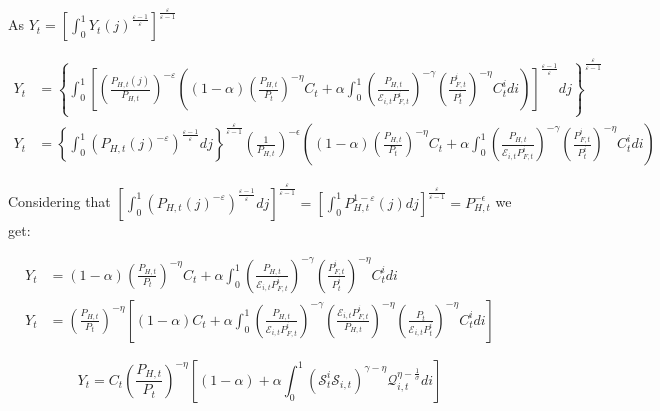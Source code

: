 \documentclass{article}
\begin{document}
As $Y_t = \left[\int^1_0 Y_t(j)^{\frac{\varepsilon-1}{\varepsilon}} \right]^\frac{\varepsilon}{\varepsilon-1}$

\begin{equation}
    \label{}
    \begin{split}
    Y_{t} &= \left\{ \int^1_0 \left[ \left( \frac{P_{H,t}(j)}{P_{H,t}} \right)^{-\varepsilon} \left((1-\alpha) \left( \frac{P_{H,t}}{P_t} \right)^{-\eta} C_t +  \alpha \int_0^1 \left( \frac{P_{H,t}}{\mathcal{E}_{i,t} P^i_{F,t}} \right)^{-\gamma} \left( \frac{P^i_{F,t}}{P^i_{t}} \right)^{-\eta} C^i_t di \right)\right]^{\frac{\varepsilon-1}{\varepsilon}}dj \right\}^\frac{\varepsilon}{\varepsilon-1}\\
    Y_{t} &= \left\{ \int^1_0 \left( P_{H,t}(j)^{-\varepsilon} \right)^{\frac{\varepsilon-1}{\varepsilon}}dj \right\}^\frac{\varepsilon}{\varepsilon-1} \left(\frac{1}{P_{H,t}}\right)^{-\epsilon} \left((1-\alpha) \left( \frac{P_{H,t}}{P_t} \right)^{-\eta} C_t +  \alpha \int_0^1 \left( \frac{P_{H,t}}{\mathcal{E}_{i,t} P^i_{F,t}} \right)^{-\gamma} \left( \frac{P^i_{F,t}}{P^i_{t}} \right)^{-\eta} C^i_t di \right)
    \end{split}
\end{equation}


Considering that $\left[ \int^1_0 \left( P_{H,t}(j)^{-\varepsilon} \right)^{\frac{\varepsilon-1}{\varepsilon}}dj \right]^\frac{\varepsilon}{\varepsilon-1} = \left[ \int^1_0 P_{H,t}^{1-\varepsilon}(j)  dj \right]^\frac{\varepsilon}{\varepsilon-1} = P_{H,t}^{-\epsilon}$ we get:

\begin{equation}
    \begin{split}
        Y_{t} &= (1-\alpha) \left( \frac{P_{H,t}}{P_t} \right)^{-\eta} C_t +  \alpha \int_0^1 \left( \frac{P_{H,t}}{\mathcal{E}_{i,t} P^i_{F,t}} \right)^{-\gamma} \left( \frac{P^i_{F,t}}{P^i_{t}} \right)^{-\eta} C^i_t di \\
        Y_{t} &= \left( \frac{P_{H,t}}{P_t} \right)^{-\eta} \left[(1-\alpha)  C_t +  \alpha \int_0^1 \left( \frac{P_{H,t}}{\mathcal{E}_{i,t} P^i_{F,t}} \right)^{-\gamma}  \left( \frac{\mathcal{E}_{i,t} P^i_{F,t}}{P_{H,t}} \right)^{-\eta} \left(\frac{P_t}{\mathcal E_{i,t} P_t^i} \right)^{-\eta} C^i_t di \right]
    \end{split}
\end{equation}

\begin{equation}
    Y_{t} = C_t \left( \frac{P_{H,t}}{P_t} \right)^{-\eta} \left[(1-\alpha)  +  \alpha \int_0^1 \left(\mathcal S^i_t \mathcal S_{i,t} \right)^{\gamma - \eta} \mathcal Q^{\eta - \frac{1}{\sigma}}_{i,t} di \right] 
\end{equation}
\end{document}
